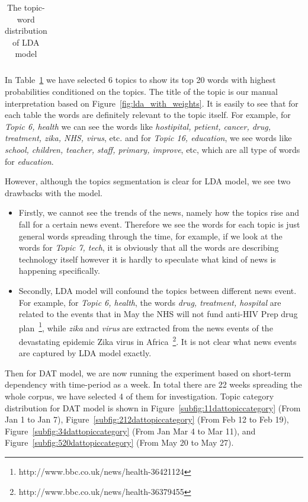 \begin{table}[h!]
\begin{tabular}{|c c|}
 \end{tabular}
\caption{The topic-word distribution of LDA model}
\label{table:ldatopicdistribution}
\end{table}

In Table~\ref{table:ldatopicdistribution} we have selected 6 topics to show its top 20 words with highest probabilities conditioned on the topics. The title of the topic is our manual interpretation based on Figure~\ref{fig:lda_with_weights}. It is easily to see that for each table the words are definitely relevant to the topic itself. For example, for \textit{Topic 6, health} we can see the words like \textit{hostipital, petient, cancer, drug, treatment, zika, NHS, virus}, etc. and for \textit{Topic 16, education}, we see words like \textit{school, children, teacher, staff, primary, improve}, etc, which are all type of words for \textit{education}. 

However, although the topics segmentation is clear for LDA model, we see two drawbacks with the model.
\begin{itemize}
    \item Firstly, we cannot see the trends of the news, namely how the topics rise and fall for a certain news event. Therefore we see the words for each topic is just general words spreading through the time, for example, if we look at the words for \textit{Topic 7, tech}, it is obviously that all the words are describing technology itself however it is hardly to speculate what kind of news is happening specifically.
    \item Secondly, LDA model will confound the topics between different news event. For example, for \textit{Topic 6, health}, the words \textit{drug, treatment, hospital} are related to the events that in May the NHS will not fund anti-HIV Prep drug plan~\footnote{http://www.bbc.co.uk/news/health-36421124}, while \textit{zika} and \textit{virus} are extracted from the news events of the devastating epidemic Zika virus in Africa~\footnote{http://www.bbc.co.uk/news/health-36379455}. It is not clear what news events are captured by LDA model exactly. 
\end{itemize}

Then for DAT model, we are now running the experiment based on short-term dependency with time-period as a week. In total there are 22 weeks spreading the whole corpus, we have selected 4 of them for investigation.
Topic category distribution for DAT model is shown in Figure~\ref{subfig:11dattopiccategory} (From Jan 1 to Jan 7), Figure~\ref{subfig:212dattopiccategory} (From Feb 12 to Feb 19), Figure~\ref{subfig:34dattopiccategory} (From Jan Mar 4 to Mar 11), and Figure~\ref{subfig:520dattopiccategory} (From May 20 to May 27).

